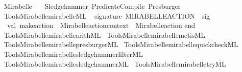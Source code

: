 %
\begin{isabellebody}%
%
%
\isadelimtheory
\isanewline
\isanewline
%
\endisadelimtheory
%
\isatagtheory
{}\isamarkupfalse%
\ Mirabelle\isanewline
\ \ \ Sledgehammer\ Predicate{\isacharunderscore}{\kern0pt}Compile\ Presburger\isanewline
{}%
\endisatagtheory
{\isafoldtheory}%
%
\isadelimtheory
\isanewline
%
\endisadelimtheory
%
\isadelimML
\isanewline
%
\endisadelimML
%
\isatagML
{}\isamarkupfalse%
\ {\isacartoucheopen}Tools{\isacharslash}{\kern0pt}Mirabelle{\isacharslash}{\kern0pt}mirabelle{\isachardot}{\kern0pt}ML{\isacartoucheclose}\isanewline
\isanewline
{}\isamarkupfalse%
\ {\isacartoucheopen}\isanewline
signature\ MIRABELLE{\isacharunderscore}{\kern0pt}ACTION\ {\isacharequal}{\kern0pt}\ sig\isanewline
\ \ val\ make{\isacharunderscore}{\kern0pt}action\ {\isacharcolon}{\kern0pt}\ Mirabelle{\isachardot}{\kern0pt}action{\isacharunderscore}{\kern0pt}context\ {\isacharminus}{\kern0pt}{\isachargreater}{\kern0pt}\ Mirabelle{\isachardot}{\kern0pt}action\isanewline
end\isanewline
{\isacartoucheclose}\isanewline
\isanewline
{}\isamarkupfalse%
\ {\isacartoucheopen}Tools{\isacharslash}{\kern0pt}Mirabelle{\isacharslash}{\kern0pt}mirabelle{\isacharunderscore}{\kern0pt}arith{\isachardot}{\kern0pt}ML{\isacartoucheclose}\isanewline
{}\isamarkupfalse%
\ {\isacartoucheopen}Tools{\isacharslash}{\kern0pt}Mirabelle{\isacharslash}{\kern0pt}mirabelle{\isacharunderscore}{\kern0pt}metis{\isachardot}{\kern0pt}ML{\isacartoucheclose}\isanewline
{}\isamarkupfalse%
\ {\isacartoucheopen}Tools{\isacharslash}{\kern0pt}Mirabelle{\isacharslash}{\kern0pt}mirabelle{\isacharunderscore}{\kern0pt}presburger{\isachardot}{\kern0pt}ML{\isacartoucheclose}\isanewline
{}\isamarkupfalse%
\ {\isacartoucheopen}Tools{\isacharslash}{\kern0pt}Mirabelle{\isacharslash}{\kern0pt}mirabelle{\isacharunderscore}{\kern0pt}quickcheck{\isachardot}{\kern0pt}ML{\isacartoucheclose}\isanewline
{}\isamarkupfalse%
\ {\isacartoucheopen}Tools{\isacharslash}{\kern0pt}Mirabelle{\isacharslash}{\kern0pt}mirabelle{\isacharunderscore}{\kern0pt}sledgehammer{\isacharunderscore}{\kern0pt}filter{\isachardot}{\kern0pt}ML{\isacartoucheclose}\isanewline
{}\isamarkupfalse%
\ {\isacartoucheopen}Tools{\isacharslash}{\kern0pt}Mirabelle{\isacharslash}{\kern0pt}mirabelle{\isacharunderscore}{\kern0pt}sledgehammer{\isachardot}{\kern0pt}ML{\isacartoucheclose}\isanewline
{}\isamarkupfalse%
\ {\isacartoucheopen}Tools{\isacharslash}{\kern0pt}Mirabelle{\isacharslash}{\kern0pt}mirabelle{\isacharunderscore}{\kern0pt}try{}{\isachardot}{\kern0pt}ML{\isacartoucheclose}%
\endisatagML
{\isafoldML}%
%
\isadelimML
\isanewline
%
\endisadelimML
%
\isadelimtheory
\isanewline
%
\endisadelimtheory
%
\isatagtheory
{}\isamarkupfalse%
%
\endisatagtheory
{\isafoldtheory}%
%
\isadelimtheory
%
\endisadelimtheory
%
\end{isabellebody}%
